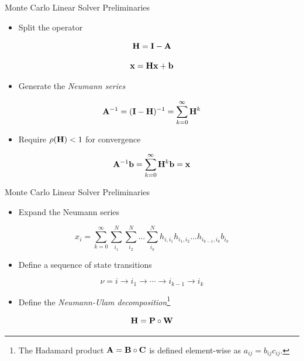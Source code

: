 \documentclass{beamer}
\begin{document}
\begin{frame}{Monte Carlo Linear Solver Preliminaries}

  \begin{itemize}
  \item Split the operator
  \end{itemize}

  \[
  \mathbf{H} = \mathbf{I} - \mathbf{A}
  \]

  \[
  \mathbf{x} = \mathbf{H} \mathbf{x} + \mathbf{b}
  \]

  \begin{itemize}
  \item Generate the \textit{Neumann series}
  \end{itemize}
  
  \[
  \mathbf{A}^{-1} = (\mathbf{I}-\mathbf{H})^{-1} = \sum_{k=0}^{\infty} \mathbf{H}^k
  \]

  \begin{itemize}
  \item Require $\rho(\mathbf{H}) < 1$ for convergence
  \end{itemize}

  \[
  \mathbf{A}^{-1}\mathbf{b} = \sum_{k=0}^{\infty} \mathbf{H}^k\mathbf{b} = \mathbf{x}
  \]

\end{frame}

\begin{frame}{Monte Carlo Linear Solver Preliminaries}

  \begin{itemize}
  \item Expand the Neumann series
  \end{itemize}

  \[
  x_i = \sum_{k=0}^{\infty}\sum_{i_1}^{N}\sum_{i_2}^{N}\ldots
  \sum_{i_k}^{N}h_{i,i_1}h_{i_1,i_2}\ldots h_{i_{k-1},i_k}b_{i_k}
  \]

  \begin{itemize}
  \item Define a sequence of state transitions
  \end{itemize}
  
  \[
  \nu = i \rightarrow i_1 \rightarrow \cdots \rightarrow i_{k-1}
  \rightarrow i_{k}
  \]

  \begin{itemize}
  \item Define the \textit{Neumann-Ulam decomposition}\footnote{The
    Hadamard product $\mathbf{A} = \mathbf{B} \circ \mathbf{C}$ is defined
    element-wise as $a_{ij} = b_{ij} c_{ij}$.}
  \end{itemize}

  \[
  \mathbf{H} = \mathbf{P} \circ \mathbf{W}
  \]

\end{frame}
\end{document}
